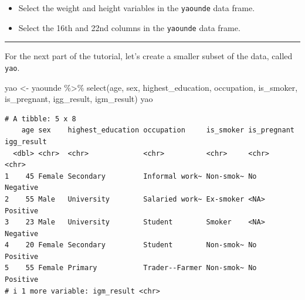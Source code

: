 \documentclass[
  letterpaper,
  DIV=11,
  numbers=noendperiod]{scrreprt}
\newenvironment{Shaded}{\begin{snugshade}}{\end{snugshade}}
\newcommand{\FunctionTok}[1]{\textcolor[rgb]{0.28,0.35,0.67}{#1}}
\newcommand{\NormalTok}[1]{\textcolor[rgb]{0.00,0.23,0.31}{#1}}
\newcommand{\OtherTok}[1]{\textcolor[rgb]{0.00,0.23,0.31}{#1}}
\newcommand{\SpecialCharTok}[1]{\textcolor[rgb]{0.37,0.37,0.37}{#1}}
\providecommand{\tightlist}{%
  \setlength{\itemsep}{0pt}\setlength{\parskip}{0pt}}\usepackage{longtable,booktabs,array}
\begin{document}
\begin{tcolorbox}[enhanced jigsaw, title=\textcolor{quarto-callout-tip-color}{\faLightbulb}\hspace{0.5em}{Practice}, colbacktitle=quarto-callout-tip-color!10!white, leftrule=.75mm, arc=.35mm, opacityback=0, bottomrule=.15mm, rightrule=.15mm, toptitle=1mm, breakable, toprule=.15mm, colback=white, coltitle=black, colframe=quarto-callout-tip-color-frame, bottomtitle=1mm, titlerule=0mm, left=2mm, opacitybacktitle=0.6]

\begin{itemize}
\tightlist
\item
  Select the weight and height variables in the \texttt{yaounde} data
  frame.
\end{itemize}

\begin{itemize}
\tightlist
\item
  Select the 16th and 22nd columns in the \texttt{yaounde} data frame.
\end{itemize}

\end{tcolorbox}

\begin{center}\rule{0.5\linewidth}{0.5pt}\end{center}

For the next part of the tutorial, let's create a smaller subset of the
data, called \texttt{yao}.

\begin{Shaded}
\begin{Highlighting}[]
\NormalTok{yao }\OtherTok{\textless{}{-}}
\NormalTok{  yaounde }\SpecialCharTok{\%\textgreater{}\%} \FunctionTok{select}\NormalTok{(age,}
\NormalTok{                     sex,}
\NormalTok{                     highest\_education,}
\NormalTok{                     occupation,}
\NormalTok{                     is\_smoker,}
\NormalTok{                     is\_pregnant,}
\NormalTok{                     igg\_result,}
\NormalTok{                     igm\_result)}
\NormalTok{yao}
\end{Highlighting}
\end{Shaded}

\begin{verbatim}
# A tibble: 5 x 8
    age sex    highest_education occupation     is_smoker is_pregnant igg_result
  <dbl> <chr>  <chr>             <chr>          <chr>     <chr>       <chr>     
1    45 Female Secondary         Informal work~ Non-smok~ No          Negative  
2    55 Male   University        Salaried work~ Ex-smoker <NA>        Positive  
3    23 Male   University        Student        Smoker    <NA>        Negative  
4    20 Female Secondary         Student        Non-smok~ No          Positive  
5    55 Female Primary           Trader--Farmer Non-smok~ No          Positive  
# i 1 more variable: igm_result <chr>
\end{verbatim}
\end{document}
